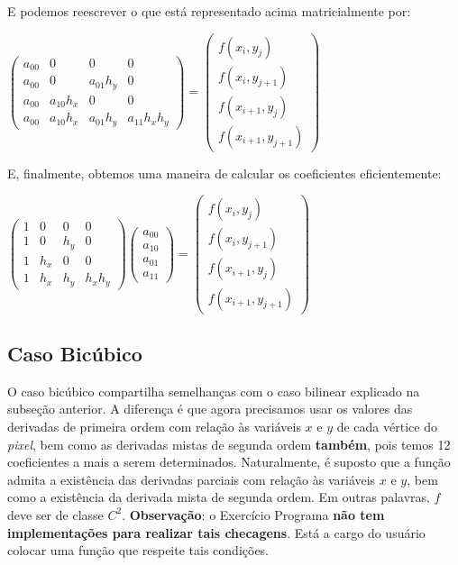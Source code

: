 \documentclass[11pt]{article}
\begin{document}
  E podemos reescrever o que está representado acima matricialmente por:

  \begin{center}
    $ \begin{pmatrix}
      a_{00} & 0         & 0         & 0 \\
      a_{00} & 0         & a_{01}h_y & 0 \\
      a_{00} & a_{10}h_x & 0         & 0 \\
      a_{00} & a_{10}h_x & a_{01}h_y & a_{11}h_xh_y
    \end{pmatrix}
    =
    \begin{pmatrix}
      f(x_i, y_j)  \\
      f(x_i, y_{j + 1})  \\
      f(x_{i + 1}, y_j)  \\
      f(x_{i + 1}, y_{j + 1})
    \end{pmatrix}$
  \end{center}

  E, finalmente, obtemos uma maneira de calcular os coeficientes eficientemente:

  \begin{center}
    $ \begin{pmatrix}
      1 & 0   & 0   & 0 \\
      1 & 0   & h_y & 0 \\
      1 & h_x & 0   & 0 \\
      1 & h_x & h_y & h_xh_y
    \end{pmatrix}
    \begin{pmatrix}
      a_{00}  \\
      a_{10}  \\
      a_{01}  \\
      a_{11}
    \end{pmatrix}
    =
    \begin{pmatrix}
      f(x_i, y_j)  \\
      f(x_i, y_{j + 1})  \\
      f(x_{i + 1}, y_j)  \\
      f(x_{i + 1}, y_{j + 1})
    \end{pmatrix}$
  \end{center}

\subsection{Caso Bicúbico}

  \indent\indent O caso bicúbico compartilha semelhanças com o caso bilinear explicado
  na subseção anterior. A diferença é que agora precisamos usar os valores das derivadas
  de primeira ordem com relação às variáveis $x$ e $y$ de cada vértice do \textit{pixel},
  bem como as derivadas mistas de segunda ordem \textbf{também}, pois temos 12 coeficientes
  a mais a serem determinados. Naturalmente, é suposto que a função admita a existência
  das derivadas parciais com relação às variáveis $x$ e $y$, bem como a existência da
  derivada mista de segunda ordem. Em outras palavras, $f$ deve ser de classe $C^2$.
  \textbf{Observação}: o Exercício Programa \textbf{não tem implementações para realizar tais
  checagens}. Está a cargo do usuário colocar uma função que respeite tais condições.
\end{document}
